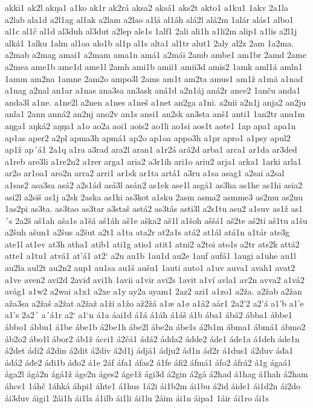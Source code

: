 akki1
ak2l
akŋa1
a1ko
ak1r
ak2rá
aksa2
aksá1
aks2t
akto1
a1ku1
1akv
2a1la
a2lab
ala1d
a2l1ag
al1ak
a2lam
a2lao
a1lá
al1áh
alá2l
alá2m
1alár
alás1
albo1
al1c
al1č
al1d
al3duh
al3dut
a2lep
ale1s
1alf1
2ali
ali1h
a1li2m
alip1
a1lis
a2l1j
alká1
1alku
1alm
al1oa
alo1b
al1p
al1s
alta1
al1tr
alut1
2aly
al2z
2am
1a2ma.
a2mab
a2mag
amai1
a2mam
ama1n
amá1
a2mái
2amb
ambe1
am1br
2amd
2ame
a2mea
ame1b
ame1d
ame1l
2amh
ami1b
amii1
amii3d
amis2
1amk
aml1á
amln1
1amm
am2na
1amne
2am2o
ampo3l
2ams
am1t
am2ta
amus1
am1ž
a1mä
a1nad
a1nag
a2nal
an1ar
a1nas
ana3sa
an3ask
aná1d
a2n1áj
aná2r
ance2
1anču
anda1
anda3l
a1ne.
a1ne2l
a2nen
a1nes
a1neš
a1net
an2ga
a1ni.
a2nii
a2n1j
anja2
an2ju
anla1
2ann
anná2
an2nj
ano2v
an1s
ansi1
an2sk
an3sta
anš1
anti1
1an2tr
anu1m
aŋga1
aŋká2
aŋŋa1
a1o
ao2a
aoi1
aois2
ao1li
ao1si
aos1t
aote1
1ap
apa1
apa1n
ap1as
aper2
a2pl
apma3h
apmá1
ap2o
ap1oa
appo3h
a1pr
apro1
a1psy
apul2
ap1ž
ap´á1
2a1q
a1ra
a3rad
ara2l
aran1
a1r2á
ará2d
arba1
arca1
ar1da
ar3ded
a1reb
are3li
a1re2n2
a1rer
arga1
aria2
a3r1ih
ari1o
ariu2
arja1
arka1
1arki
arla1
ar2o
ar1oa1
aro2n
arra2
arri1
ar1sk
ar1ta
artá1
a3ru
a1sa
asag1
a2sai
a2sal
a1sas2
asa3sa
asá2
a2s1ád
asá3l
asán2
as1ek
ase1l
asgá1
as3ha
as1he
as1hi
asia2
asi2l
a2siš
as1j
a2sk
2aska
as1ki
as3kot
a1sku
2asm
asma2
asmme3
as2mu
as2nu
1as2pi
as3ta.
as3tao
as3tar
a3staš
astá2
as3tás
asti3l
a2s1tu
asu2
a1suv
as1ž
as1´s
2a2š
aš1ah
aša1s
a1šá
aš1áh
aš1e
aška2
aš1l
a1šoh
aššá1
aš2te
aš2ti
aš1tu
a1šu
a2šuh
ašun1
a2šus
a2šut
a2t1
a1ta
ata2r
at2a1s
atá2
at1ál
atá1n
a1tár
ate3g
ate1l
at1ev
at3h
atha1
atib1
ati1g
atio1
atit1
atni2
a2toi
ato1s
a2tr
ats2k
attá2
atte1
a1tu1
atvá1
at'á1
at2`
a2u
au1b
1au1d
au2e
1auf
aufá1
1augi
a1uhe
au1l
au2la
aul2t
au2n2
aup1
au1sa
au1š
aušu1
1auti
auto1
a1uv
auva1
avah1
avat2
a1ve
aven2
avi2d
2aviđ
avi1h
1avii
a1vir
avi2s
1avit
a1ví
avla1
av2n
avva2
a1vå2
avåg1
a1w2
a2wai
a1x1
a2xe
a1y
ay2a
ayam1
2az2
azi1
a1zo1
a2ža.
a2žab
a2žan
aža3sa
a2žaš
a2žat
a2žaž
a1ži
a1žo
až2žá
a1æ
a1ø
a1å2
aår1
2a2'2
a2'á
a1'b
a1'e
a1's
2a2´
a´á1r
a2`
a1`n
á1a
áai1d
á1á
á1áh
á1áš
á1b
ába1
ábá2
ábba1
ábbe1
ábbo1
ábbu1
á1be
ábe1b
á2be1h
ábe2l
ábe2n
ábe1s
á2b1m
ábma1
ábmá1
ábmo2
áb2o2
ábo1l
ábor2
áb1ž
ácci1
á2čá1
ádá2
ádda2
ádde2
áde1
áde1a
á1deh
áde1n
á2det
ádi2
á2din
á2dit
á2div
á2d1j
ádjá1
ádju2
ád1n
ád2r
á1dus1
á2duv
áđa1
áđá2
áđe2
áđi1b
áđo2
á1e
2áf
áfa1
áfas2
á1fe
áfi2
áfmá1
áfo2
áfrá2
á1g
ágaá1
ága2l
ágá2n
ágá1ž
áge2n
áges2
áge1ž
ági3d
á2gin
á2gå
á2had
á1hag
á1hah
á2ham
áhce1
1áhč
1áhká
áhpi1
áhte1
á1hus
1á2i
ái1b2m
ái1bu
á2id
áide1
ái1d2n
ái2do
ái3duv
áigi1
2ái1h
ái1la
á1ilb
ái1li
ái1lu
2áim
ái1n
áipa1
1áir
ái1ro
ái1s
